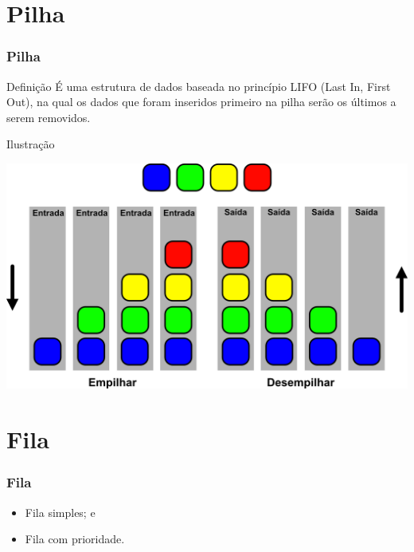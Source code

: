 \documentclass{beamer}
\begin{document}
\section{Pilha}

\begin{frame}
\frametitle{Pilha}

\begin{block}{Definição}
	É uma estrutura de dados baseada no princípio LIFO (Last In, First Out), na qual os dados que foram inseridos primeiro na pilha serão os últimos a serem removidos.
\end{block}\vfill

\begin{exampleblock}{Ilustração}
	\begin{center}
		\includegraphics[scale=0.5]{img/pilha.png}
	\end{center}
\end{exampleblock}
\end{frame}

\section{Fila}

\begin{frame}
\frametitle{Fila}

\begin{itemize}
	\item Fila simples; e
	\item Fila com prioridade.
\end{itemize}
\end{frame}
\end{document}
